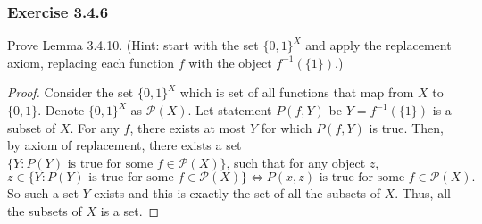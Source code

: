 \documentclass[12pt, letter]{article}
\begin{document}
\subsubsection*{Exercise 3.4.6}
Prove Lemma 3.4.10. (Hint: start with the set ${\{0,1\}}^X$ and apply the replacement axiom, replacing each function $f$ with the object $f^{-1}(\{1\})$.)
\begin{proof}
    Consider the set ${\{0,1\}}^X$ which is set of all functions that map from $X$ to $\{0,1\}$. Denote ${\{0,1\}}^X$ as $\mathcal{P}(X)$. 
    Let statement $P(f,Y)$ be $Y=f^{-1}(\{1\})$ is a subset of $X$. For any $f$, there exists at most $Y$ for which $P(f, Y)$ is true. 
    Then, by axiom of replacement, there exists a set $\{Y:P(Y)\text{ is true for some }f\in \mathcal{P}(X)\}$, such that for any object $z$,
    \begin{equation*}
        z\in \{Y:P(Y)\text{ is true for some }f\in \mathcal{P}(X)\}\iff P(x,z)\text{ is true for some }f\in\mathcal{P}(X).
    \end{equation*}
    So such a set $Y$ exists and this is exactly the set of all the subsets of $X$. Thus, all the subsets of $X$ is a set.
\end{proof}
\end{document}
